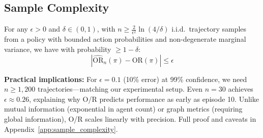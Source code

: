 
\subsection{Sample Complexity}
\label{subsec:sample_complexity}

\begin{theorem}
\label{thm:sample_complexity}
For any $\epsilon > 0$ and $\delta \in (0,1)$, with $n \geq \frac{2}{\epsilon^2} \ln(4/\delta)$ i.i.d.\ trajectory samples from a policy with bounded action probabilities and non-degenerate marginal variance, we have with probability $\geq 1 - \delta$:
\begin{equation}
|\widehat{\text{OR}}_n(\pi) - \text{OR}(\pi)| \leq \epsilon
\end{equation}
\end{theorem}

\textbf{Practical implications:} For $\epsilon = 0.1$ (10\% error) at 99\% confidence, we need $n \geq 1{,}200$ trajectories—matching our experimental setup. Even $n = 30$ achieves $\epsilon \approx 0.26$, explaining why O/R predicts performance as early as episode 10. Unlike mutual information (exponential in agent count) or graph metrics (requiring global information), O/R scales linearly with precision. Full proof and caveats in Appendix~\ref{app:sample_complexity}.
